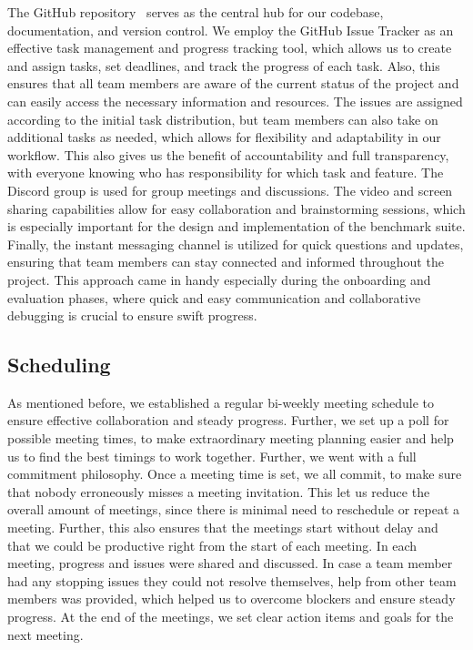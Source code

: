 \documentclass[conference,12pt]{IEEEtran}
\begin{document}
    The GitHub repository~\cite{Team7} serves as the central hub for our codebase, documentation, and version control.
    We employ the GitHub Issue Tracker as an effective task management and progress tracking tool, which allows us to create and assign tasks, set deadlines, and track the progress of each task.
    Also, this ensures that all team members are aware of the current status of the project and can easily access the necessary information and resources.
    The issues are assigned according to the initial task distribution, but team members can also take on additional tasks as needed, which allows for flexibility and adaptability in our workflow.
    This also gives us the benefit of accountability and full transparency, with everyone knowing who has responsibility for which task and feature.
    The Discord group is used for group meetings and discussions.
    The video and screen sharing capabilities allow for easy collaboration and brainstorming sessions, which is especially important for the design and implementation of the benchmark suite.
    Finally, the instant messaging channel is utilized for quick questions and updates, ensuring that team members can stay connected and informed throughout the project.
    This approach came in handy especially during the onboarding and evaluation phases, where quick and easy communication and collaborative debugging is crucial to ensure swift progress.

    \subsection{Scheduling}

    As mentioned before, we established a regular bi-weekly meeting schedule to ensure effective collaboration and steady progress.
    Further, we set up a poll for possible meeting times, to make extraordinary meeting planning easier and help us to find the best timings to work together.
    Further, we went with a full commitment philosophy. Once a meeting time is set, we all commit, to make sure that nobody erroneously misses a meeting invitation.
    This let us reduce the overall amount of meetings, since there is minimal need to reschedule or repeat a meeting. Further, this also ensures that the meetings start without delay and that we could be productive right from the start of each meeting. 
    In each meeting, progress and issues were shared and discussed. In case a team member had any stopping issues they could not resolve themselves, help from other team members was provided, which helped us to overcome blockers and ensure steady progress. At the end of the meetings, we set clear action items and goals for the next meeting.
\end{document}
